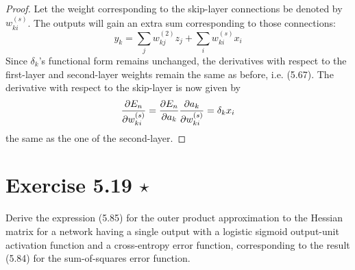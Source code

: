 \vspace{1em}

\begin{proof}
    Let the weight corresponding to the skip-layer connections be denoted by $w_{ki}^{(s)}$. 
    The outputs will gain an extra sum corresponding to those connections:
    \[
        y_k = \sum_{j} w_{kj}^{(2)} z_j + \sum_{i} w_{ki}^{(s)} x_i
    \] 
    Since $\delta_k$'s functional form remains unchanged, the derivatives
    with respect to the first-layer and second-layer weights remain the same as
    before, i.e. (5.67). The derivative with respect to the skip-layer is now given by
    \[
        \pdv{E_n}{w_{ki}^{(s)}} = \pdv{E_n}{a_k} \pdv{a_k}{w_{ki}^{(s)}}
        = \delta_k x_i
    \] 
    the same as the one of the second-layer.
\end{proof}

\section*{Exercise 5.19 $\star$}
Derive the expression (5.85) for the outer product approximation
to the Hessian matrix for a network having a single output
with a logistic sigmoid output-unit activation function and a cross-entropy
error function, corresponding to the result (5.84) for the
sum-of-squares error function.

\vspace{1em}

